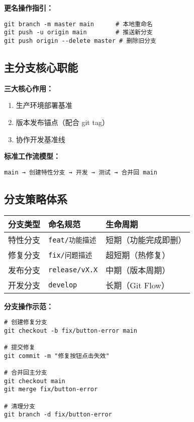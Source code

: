 \textbf{更名操作指引：}
\begin{verbatim}
git branch -m master main      # 本地重命名
git push -u origin main        # 推送新分支
git push origin --delete master # 删除旧分支
\end{verbatim}

\subsection{主分支核心职能}
\textbf{三大核心作用：}
\begin{enumerate}[leftmargin=*, nosep]
    \item 生产环境部署基准
    \item 版本发布锚点（配合 git tag）
    \item 协作开发基准线
\end{enumerate}

\textbf{标准工作流模型：}
\begin{verbatim}
main → 创建特性分支 → 开发 → 测试 → 合并回 main
\end{verbatim}

\subsection{分支策略体系}
\begin{center}
\begin{tabular}{lll}
    \toprule
    \textbf{分支类型} & \textbf{命名规范} & \textbf{生命周期} \\
    \midrule
    特性分支 & \texttt{feat/功能描述} & 短期（功能完成即删） \\
    修复分支 & \texttt{fix/问题描述} & 超短期（热修复） \\
    发布分支 & \texttt{release/vX.X} & 中期（版本周期） \\
    开发分支 & \texttt{develop} & 长期（Git Flow） \\
    \bottomrule
\end{tabular}
\end{center}

\textbf{分支操作示范：}
\begin{verbatim}
# 创建修复分支
git checkout -b fix/button-error main

# 提交修复
git commit -m "修复按钮点击失效"

# 合并回主分支
git checkout main
git merge fix/button-error

# 清理分支
git branch -d fix/button-error
\end{verbatim}

